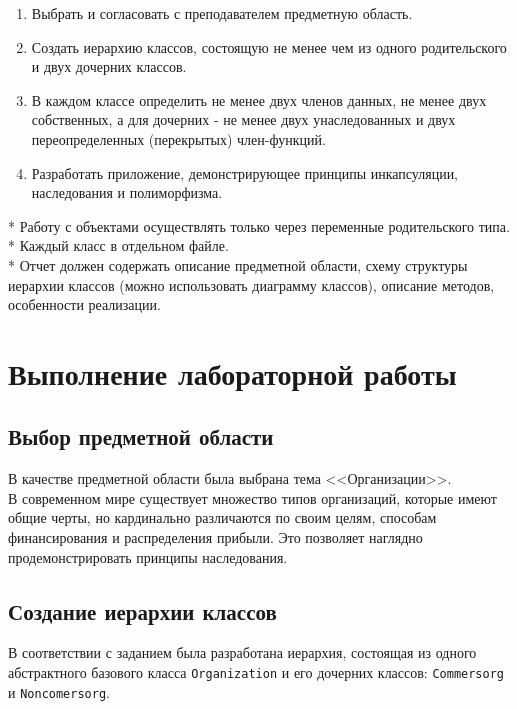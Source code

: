 \documentclass[oneside,a4paper,14pt]{extarticle}
\begin{document}
\begin{enumerate}
	\item Выбрать и согласовать с преподавателем предметную область.
	\item Создать иерархию классов, состоящую не менее чем из одного родительского и двух дочерних классов.
	\item В каждом классе определить не менее двух членов данных, не менее двух собственных, а для дочерних - не менее двух унаследованных и двух переопределенных (перекрытых) член-функций.
	\item Разработать приложение, демонстрирующее принципы инкапсуляции, наследования и полиморфизма.
\end{enumerate}
* Работу с объектами осуществлять только через переменные родительского типа. \\
* Каждый класс в отдельном файле. \\
* Отчет должен содержать описание предметной области, схему структуры иерархии классов (можно использовать диаграмму классов), описание методов, особенности реализации.
\newpage

\section*{Выполнение лабораторной работы}

\subsection*{Выбор предметной области}
В качестве предметной области была выбрана тема <<Организации>>. \\
В современном мире существует множество типов организаций, которые имеют общие черты, но кардинально различаются по своим целям, способам финансирования и распределения прибыли. Это позволяет наглядно продемонстрировать принципы наследования.

\subsection*{Создание иерархии классов}
В соответствии с заданием была разработана иерархия, состоящая из одного абстрактного базового класса \texttt{Organization} и его дочерних классов: \texttt{Commersorg} и \texttt{Noncomersorg}.
\end{document}
